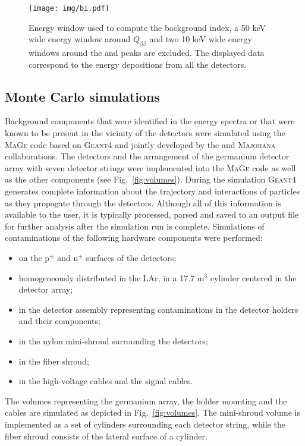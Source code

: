 \begin{figure}
	\centering
	\texttt{[image: img/bi.pdf]}
	\caption{Energy window used to compute the background index, a 50 keV wide energy window around $Q_{\beta\beta}$ and two 10 keV wide energy windows around the  and  peaks are excluded. The displayed data correspond to the energy depositions from all the {\gerda} detectors.}
	\label{fig:bi}
\end{figure}
\subsection*{Monte Carlo simulations}
Background components that were identified in the energy spectra or that were known to be present in the vicinity of the detectors were simulated using the \textsc{MaGe} \cite{MaGe} code based on \textsc{Geant4} \cite{geant4} and jointly developed by the {\gerda} and \textsc{Majorana} \cite{majoranadem} collaborations. The detectors and the arrangement of the germanium detector array with seven detector strings were implemented into the \textsc{MaGe} code as well as the other {\gerda} components (see Fig.~\ref{fig:volumes}). During the simulation \textsc{Geant4} generates complete information about the trajectory and interactions of particles as they propagate through the detectors. Although all of this information is available to the user, it is typically processed, parsed and saved to an output file for further analysis after the simulation run is complete. Simulations of contaminations of the following hardware components were performed:
\begin{itemize}
	\item on the p$^+$ and n$^+$ surfaces of the detectors;
	\item homogeneously distributed in the LAr, in a 17.7 m$^3$ cylinder centered in the detector array;
	\item in the detector assembly representing contaminations in the detector holders and their components;
	\item in the nylon mini-shroud surrounding the detectors;
	\item in the fiber shroud;
	\item in the high-voltage cables and the signal cables.
\end{itemize}
The volumes representing the germanium array, the holder mounting and the cables are simulated as depicted in Fig.~\ref{fig:volumes}. The mini-shroud volume is implemented as a set of cylinders surrounding each detector string, while the fiber shroud consists of the lateral surface of a cylinder.
